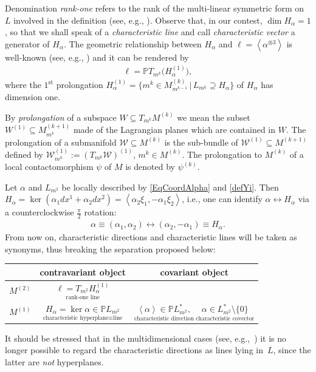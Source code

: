 \documentclass[10pt,a4paper]{amsart}
\newcommand{\Span}[1]{\left\langle #1 \right\rangle}
\renewcommand{\P}{\mathbb{P}}
\newcommand{\St}{^\textrm{st}}
\numberwithin{equation}{section}
\begin{document}
Denomination \emph{rank-one} refers to the rank of the multi-linear symmetric form on $L$ involved in the def\/inition (see, e.g., \cite{MR2369200}).
Observe that, in our contest, $\dim H_\alpha=1$, so that we shall speak of a \emph{characteristic line} and call \emph{characteristic vector} a generator of $H_{\alpha}$. The geometric relationship between $H_\alpha$ and $\ell=\Span{\alpha^{\otimes 3}}$ is well-known (see, e.g., \cite{LucaChar}) and it can be rendered by
\begin{gather}\label{eqGeometriaDelRaggio}
\ell=\P T_{m^k}\big( H_\alpha^{(1)} \big),
\end{gather}
where the $1\St$ {prolongation} $ H_\alpha^{(1)}=\{ {m}^k\in M^{(k)}_{m^{k-1}}\,|\, L_{ {m}^k}\supseteq H_\alpha \}$ of $H_\alpha$ has dimension one.

By \emph{prolongation} of a subspace $W\subseteq T_{m^k}M^{(k)}$ we mean the subset $W^{(1)}\subseteq M^{(k+1)}_{m^k}$ made of the Lagrangian planes which are contained in $W$. The prolongation of a submanifold $\mathcal{W}\subseteq M^{(k)}$ is the sub-bundle of $\mathcal{W}^{(1)}\subseteq M^{(k+1)}$ def\/ined by $\mathcal{W}^{(1)}_{m^k}:=(T_{m^k}\mathcal{W})^{(1)}$, $m^k\in M^{(k)}$. The prolongation to $M^{(k)}$ of a local contactomorphism $\psi$ of $M$ is denoted by $\psi^{(k)}$.

\begin{Remark}\label{RemarcoFondamentale}
 Let $\alpha$ and $L_{m^2}$ be locally described by \eqref{EqCoordAlpha} and \eqref{defYi}. Then $ H_\alpha= \ker(\alpha_1dx^1+\alpha_2dx^2)=\Span{\alpha_2 \xi_1,-\alpha_1 \xi _2}$,
i.e., one can identify $\alpha\leftrightarrow H_\alpha$ via a counterclockwise $\frac{\pi}{2}$ rotation:
\begin{gather}\label{RotazioneDelCazzo}
\alpha\equiv (\alpha_1,\alpha_2)\leftrightarrow(\alpha_2,-\alpha_1)\equiv H_\alpha.
\end{gather}
From now on, characteristic directions and characteristic lines
 will be taken as synonyms, thus breaking the separation proposed below:
\begin{center}
\begin{tabular}{c|c|c}
&contravariant object& covariant object \\
\hline
$M^{(2)}$&$\underset{\textrm{rank-one line}}{\ell=T_{m^2} H_\alpha^{(1)}}$ & \\
\hline
$M^{(1)}$&$\underset{\textrm{characteristic hyperplane}\equiv\textrm{line}}{H_\alpha=\ker\alpha\in \P L_{m^2} }$ & $\underset{\textrm{characteristic direction}}{\Span{\alpha}\in\P L_{m^2}^\ast,}\ \underset{\textrm{characteristic covector}}{\alpha\in L_{m^2}^\ast{\setminus}\{0\}}$
\end{tabular}
\end{center}

It should be stressed that in the multidimensional cases (see, e.g.,~\cite{MR2985508})
it is no longer possible to regard the characteristic directions as lines lying in~$L$, since the latter are \emph{not} hyperplanes.
\end{Remark}
\end{document}
